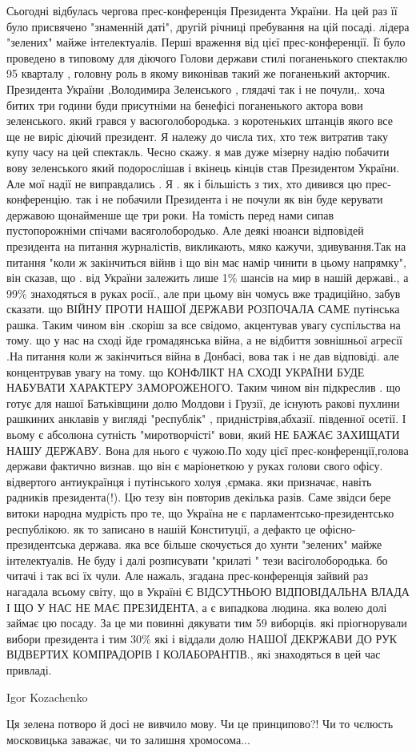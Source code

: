 Сьогодні відбулась чергова прес-конференція Президента України. На цей раз її
було присвячено "знаменній даті", другій річниці пребування на цій посаді.
лідера "зелених" майже інтелектуалів. Перші враження від цієї прес-конференції.
Її було проведено в типовому для діючого Голови держави стилі поганенького
спектаклю 95 кварталу , головну роль в якому виконівав такий же поганенький
акторчик. Президента України ,Володимира Зеленського , глядачі так і не
почули,. хоча битих три години буди присутніми на бенефісі поганенького актора
вови зеленського. який грався у васюголобородька. з коротеньких штанців якого
все ще не виріс діючий президент. Я належу до числа тих, хто теж витратив таку
купу часу на цей спектакль. Чесно скажу. я мав дуже мізерну надію побачити вову
зеленського який подорослішав і вкінець кінців став Президентом України. Але
мої надії не виправдались . Я . як і більшість з тих, хто дивився цю
прес-конференцію. так і не побачили Президента і не почули як він буде керувати
державою щонайменше ще три роки. На томість перед нами сипав пустопорожніми
спічами васяголобородько. Але деякі нюанси відповідей президента на питання
журналістів, викликають, мяко кажучи, здивування.Так на питання "коли ж
закінчиться війнв і що він має намір чинити в цьому напрямку", він сказав, що .
від України залежить лише 1\% шансів на мир в нашій державі., а 99\% знаходяться
в руках росії., але при цьому він чомусь вже традиційно, забув сказати. що
ВІЙНУ ПРОТИ НАШОЇ ДЕРЖАВИ РОЗПОЧАЛА САМЕ путінська рашка. Таким чином він
.скоріш за все свідомо, акцентував увагу суспільства на тому. що у нас на сході
йде громадянська війна, а не відбиття зовнішньої агресії .На питання коли ж
закінчиться війна в Донбасі, вова так і не дав відповіді. але концентрував
увагу на тому. що КОНФЛІКТ НА СХОДІ УКРАЇНИ БУДЕ НАБУВАТИ ХАРАКТЕРУ
ЗАМОРОЖЕНОГО. Таким чином він підкреслив . що готує для нашої Батьківщини долю
Молдови і Грузії, де існують ракові пухлини рашкиних анклавів у вигляді
"республік" , придністрівя,абхазії. південної осетії. І вьому є абсолюна
сутність "миротворчісті" вови, який НЕ БАЖАЄ ЗАХИЩАТИ НАШУ ДЕРЖАВУ. Вона для
нього є чужою.По ходу цієї прес-конференції,голова держави фактично визнав. що
він є маріонеткою у руках голови свого офісу. відвертого антиукраїнця і
путінського холуя ,єрмака. яки призначає, навіть радників президента(!). Цю
тезу він повторив декілька разів. Саме звідси бере витоки народна мудрість про
те, що Україна не є парламентсько-президентсько республікою. як то записано в
нашій Конституції, а дефакто це офісно-президентська держава. яка все більше
скочується до хунти "зелених" майже інтелектуалів. Не буду і далі розписувати
"крилаті " тези васіголобородька. бо читачі і так всі їх чули. Але нажаль,
згадана прес-конференція зайвий раз нагадала всьому світу, що в Україні Є
ВІДСУТНЬОЮ ВІДПОВІДАЛЬНА ВЛАДА І ЩО У НАС НЕ МАЄ ПРЕЗИДЕНТА, а є випадкова
людина. яка волею долі займає цю посаду. За це ми повинні дякувати тим 59%
виборців. які пріогнорували вибори президента і тим 30\% які і віддали долю
НАШОЇ ДЕКРЖАВИ ДО РУК ВІДВЕРТИХ КОМПРАДОРІВ І КОЛАБОРАНТІВ., які знаходяться в
цей час привладі.

Igor Kozachenko

Ця зелена потворо й досі не вивчило мову. Чи це принципово?! Чи то чєлюсть
московицька заважає, чи то залишня хромосома...
